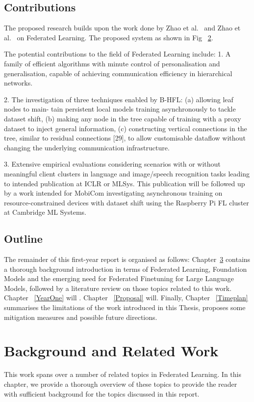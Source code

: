 \documentclass[withindex,glossary]{cam-thesis}
\begin{document}
\section{Contributions} 
% 

The proposed research builds upon the work done by Zhao et al.~\cite{} and Zhao et al.~\cite{} on Federated Learning. The proposed system as shown in Fig ~\ref{}. 

The potential contributions to the field of Federated Learning include:
1. A family of efficient algorithms with minute control of personalisation and generalisation, capable of achieving communication efficiency in hierarchical networks.



2. The investigation of three techniques enabled by B-HFL: (a) allowing leaf nodes to main- tain persistent local models training asynchronously to tackle dataset shift, (b) making any node in the tree capable of training with a proxy dataset to inject general information, (c) constructing vertical connections in the tree, similar to residual connections [29], to allow customisable dataflow without changing the underlying communication infrastructure.

3. Extensive empirical evaluations considering scenarios with or without meaningful client clusters in language and image/speech recognition tasks leading to intended publication at ICLR or MLSys. This publication will be followed up by a work intended for MobiCom investigating asynchronous training on resource-constrained devices with dataset shift using the Raspberry Pi FL cluster at Cambridge ML Systems.

\section{Outline}
The remainder of this first-year report is organised as follows: Chapter~\ref{Background} contains a thorough background introduction in terms of Federated Learning, Foundation Models and the emerging need for Federated Finetuning for Large Language Models, followed by a literature review on those topics related to this work. Chapter ~\ref{YearOne} will . Chapter ~\ref{Proposal} will. Finally, Chapter ~\ref{Timeplan} summarises the limitations of the work introduced in this Thesis, proposes some mitigation measures and possible future directions. %


\chapter{Background and Related Work} \label{Background}
This work spans over a number of related topics in Federated Learning. In this chapter, we provide a thorough overview of these topics to provide the reader with sufficient background for the topics discussed in this report.
\end{document}
